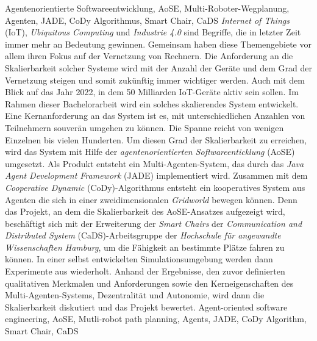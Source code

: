 \documentclass[draft=false
              ,paper=a4
              ,twoside=false
              ,fontsize=11pt
              ,headsepline
              ,BCOR=10mm
              ]{scrbook}
\begin{document}
\HAWAbstractPage
{Agentenorientierte Softwareentwicklung, AoSE, Multi-Roboter-Wegplanung, Agenten, JADE, CoDy Algorithmus, Smart Chair, CaDS}
{\textit{Internet of Things} (IoT), \textit{Ubiquitous Computing} und \textit{Industrie 4.0} sind Begriffe, die in letzter Zeit immer mehr an Bedeutung gewinnen. Gemeinsam haben diese Themengebiete vor allem ihren Fokus auf der Vernetzung von Rechnern. Die Anforderung an die Skalierbarkeit solcher Systeme wird mit der Anzahl der Geräte und dem Grad der Vernetzung steigen und somit zukünftig immer wichtiger werden. Auch mit dem Blick auf das Jahr 2022, in dem 50 Milliarden IoT-Geräte aktiv sein sollen.\newline
Im Rahmen dieser Bachelorarbeit wird ein solches skalierendes System entwickelt. Eine Kernanforderung an das System ist es, mit unterschiedlichen Anzahlen von Teilnehmern souverän umgehen zu können. Die Spanne reicht von wenigen Einzelnen bis vielen Hunderten. Um diesen Grad der Skalierbarkeit zu erreichen, wird das System mit Hilfe der \textit{agentenorientierten Softwareenticklung} (AoSE) umgesetzt. Als Produkt entsteht ein Multi-Agenten-System, das durch das \textit{Java Agent Development Framework} (JADE) implementiert wird. Zusammen mit dem \textit{Cooperative Dynamic} (CoDy)-Algorithmus entsteht ein kooperatives System aus Agenten die sich in einer zweidimensionalen \textit{Gridworld} bewegen können.\newline
Denn das Projekt, an dem die Skalierbarkeit des AoSE-Ansatzes aufgezeigt wird, beschäftigt sich mit der Erweiterung der \textit{Smart Chairs} der \textit{Communication and Distributed System} (CaDS)-Arbeitsgruppe der \textit{Hochschule für angewandte Wissenschaften Hamburg}, um die Fähigkeit an bestimmte Plätze fahren zu können.\newline
In einer selbst entwickelten Simulationsumgebung werden dann Experimente aus \cite{book:regele} wiederholt. Anhand der Ergebnisse, den zuvor definierten qualitativen Merkmalen und Anforderungen sowie den Kerneigenschaften des Multi-Agenten-Systems, Dezentralität und Autonomie, wird dann die Skalierbarkeit diskutiert und das Projekt bewertet.}
{Agent-oriented software engineering, AoSE, Mutli-robot path planning, Agents, JADE, CoDy Algorithm, Smart Chair, CaDS}
\end{document}
